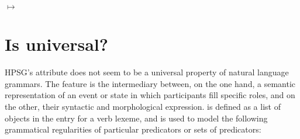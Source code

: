 \documentclass[output=paper
 	        ,biblatex
                ,babelshorthands
                ,newtxmath
                ,draftmode
                ,colorlinks, citecolor=brown
]{langscibook}
\begin{document}
\begin{exe}
	\ex\label{neg-lr}
\avm{
	[arg-st & \1 ]
}
	$\mapsto$
\end{exe}

 

\section{Is  \texorpdfstring{\argst}{ARG-ST} universal?}

%


HPSG's \argst attribute does not seem to be a universal property of natural
language grammars.  The \argst feature is the intermediary between, on
the one hand, a semantic representation of an event or state in which
participants fill specific roles, and on the other, their syntactic and
morphological expression.  \argst is defined as a list of 
objects in the entry for a verb lexeme, and is used to model the following grammatical regularities of particular predicators or sets of predicators:
\end{document}
